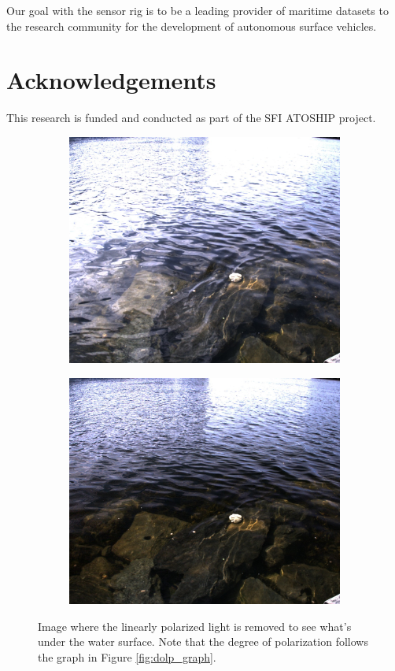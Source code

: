 Our goal with the sensor rig is to be a leading provider of maritime datasets to the research community for the development of autonomous surface vehicles.

\section{Acknowledgements}
This research is funded and conducted as part of the SFI ATOSHIP project.

\begin{figure}[H]
    \begin{subfigure}[T]{.49\textwidth}
        \includegraphics[width=\textwidth]{figures/pictures/img_4722_s0.jpg}
    \end{subfigure} \hfill
    \begin{subfigure}[T]{.49\textwidth}
        \includegraphics[width=\textwidth]{figures/pictures/img_4722_unpol.jpg}
    \end{subfigure}
    \caption{Image where the linearly polarized light is removed to see what's under the water surface. 
    Note that the degree of polarization follows the graph in Figure \ref{fig:dolp_graph}.}
\end{figure}
